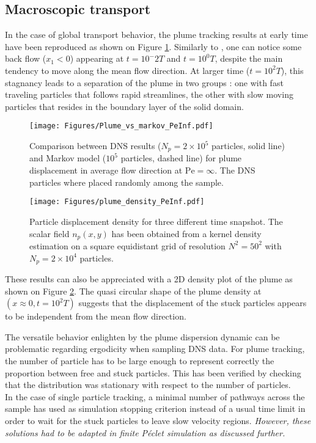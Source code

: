 \subsection{Macroscopic transport}
In the case of global transport behavior, the plume tracking results at early time have been reproduced as shown on Figure \ref{fig:plume_peinf}. 
Similarly to \cite{Meyer2016}, one can notice some back flow ($x_1<0$) appearing at $t=10^-2T$ and $t=10^0T$, despite the main tendency to move along the mean flow direction.  
At larger time ($t=10^2T$), this stagnancy leads to a separation of the plume in two groups : one with fast traveling particles that follows rapid streamlines, the other with slow moving particles that resides in the boundary layer of the solid domain.\\
\begin{figure}
	\centering
	\texttt{[image: Figures/Plume\_vs\_markov\_PeInf.pdf]}
	\caption{Comparison between DNS results ($N_p=2\times 10^5$ particles, solid line) and Markov model ($10^5$ particles, dashed line) for plume displacement in average flow direction at $\mathrm{Pe}=\infty$. The DNS particles where placed randomly among the sample.}
	\label{fig:plume_peinf}
\end{figure}
\begin{figure}
	\centering
	\texttt{[image: Figures/plume\_density\_PeInf.pdf]}
	\caption{Particle displacement density for three different time snapshot. The scalar field $n_p(x,y)$ has been obtained from a kernel density estimation on a square equidistant grid of resolution $N^2=50^2$ with $N_p = 2\times 10^4$ particles.}
	\label{fig:plume_density_peinf}
\end{figure}
These results can also be appreciated with a 2D density plot of the plume as shown on Figure \ref{fig:plume_density_peinf}. 
The quasi circular shape of the plume density at $(x\approx 0, t=10^2 T)$ suggests that the displacement of the stuck particles appears to be independent from the mean flow direction.

The versatile behavior enlighten by the plume dispersion dynamic can be problematic regarding ergodicity when sampling DNS data.
For plume tracking, the number of particle has to be large enough to represent correctly the proportion between free and stuck particles.
This has been verified by checking that the distribution was stationary with respect to the number of particles.\\
In the case of single particle tracking, a minimal number of pathways across the sample has used as simulation stopping criterion instead of a usual time limit in order to wait for the stuck particles to leave slow velocity regions.
\textit{However, these solutions had to be adapted in finite Péclet simulation as discussed further. }

